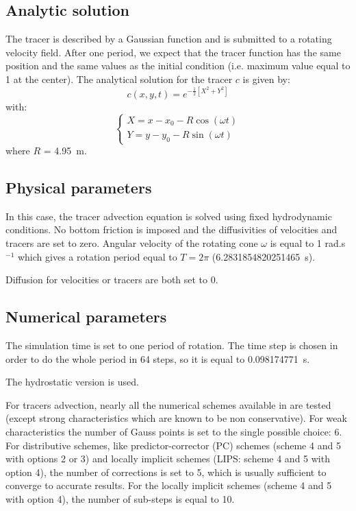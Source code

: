 \subsection{Analytic solution}

The tracer is described by a Gaussian function and is submitted to a rotating
velocity field.
After one period, we expect that the tracer function has the same position and
the same values as the initial condition (i.e. maximum value equal to 1 at the center).
The analytical solution for the tracer $c$ is given by:
\begin{equation*}
c(x,y,t)=e^{-\frac{1}{2}[X^2+Y^2]}
\end{equation*}
with:
\begin{equation*}
\left\{
    \begin{array}{ll}
        X = x - x_0 - R \cos(\omega t) \\
        Y = y - y_0 - R \sin(\omega t)
    \end{array}
\right.
\end{equation*}
where $R$ = 4.95~m.

\subsection{Physical parameters}

In this case, the tracer advection equation is solved using fixed hydrodynamic conditions.
No bottom friction is imposed and the diffusivities of velocities and tracers are set to zero.
Angular velocity of the rotating cone $\omega$ is equal to 1 rad.s$^{-1}$ which gives a
rotation period equal to $T=2\pi$ (6.2831854820251465~s).

Diffusion for velocities or tracers are both set to 0.

\subsection{Numerical parameters}

The simulation time is set to one period of rotation.
The time step is chosen in order to do the whole period in 64 steps, so it is
equal to 0.098174771~s.

The hydrostatic version is used.

For tracers advection, nearly all the numerical schemes available in 
are tested (except strong characteristics which are known to be non conservative).
For weak characteristics the number of Gauss points is set to the single
possible choice: 6.
For distributive schemes, like predictor-corrector (PC) schemes (scheme 4 and 5
with options 2 or 3) and locally implicit schemes (LIPS: scheme 4 and 5 with option 4),
the number of corrections is set to 5, which is usually sufficient to converge
to accurate results.
For the locally implicit schemes (scheme 4 and 5 with option 4), the number of
sub-steps is equal to 10.

